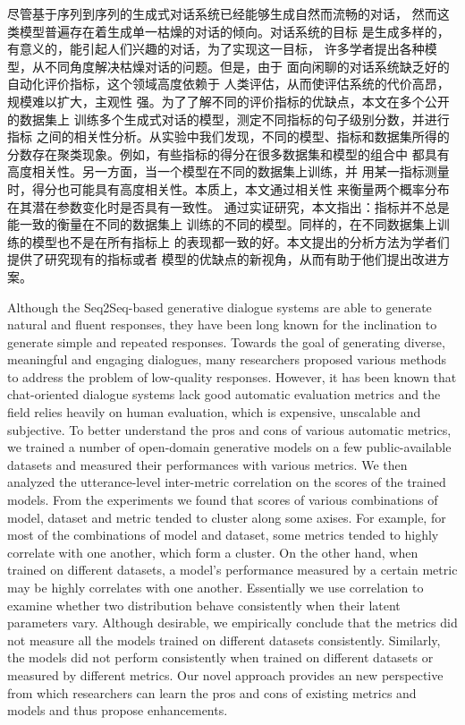 
\begin{cabstract}
    尽管基于序列到序列的生成式对话系统已经能够生成自然而流畅的对话，
    然而这类模型普遍存在着生成单一枯燥的对话的倾向。对话系统的目标
    是生成多样的，有意义的，能引起人们兴趣的对话，为了实现这一目标，
    许多学者提出各种模型，从不同角度解决枯燥对话的问题。但是，由于
    面向闲聊的对话系统缺乏好的自动化评价指标，这个领域高度依赖于
    人类评估，从而使评估系统的代价高昂，规模难以扩大，主观性
    强。为了了解不同的评价指标的优缺点，本文在多个公开的数据集上
    训练多个生成式对话的模型，测定不同指标的句子级别分数，并进行指标
    之间的相关性分析。从实验中我们发现，不同的模型、指标和数据集所得的
    分数存在聚类现象。例如，有些指标的得分在很多数据集和模型的组合中
    都具有高度相关性。另一方面，当一个模型在不同的数据集上训练，并
    用某一指标测量时，得分也可能具有高度相关性。本质上，本文通过相关性
    来衡量两个概率分布在其潜在参数变化时是否具有一致性。
    通过实证研究，本文指出：指标并不总是能一致的衡量在不同的数据集上
    训练的不同的模型。同样的，在不同数据集上训练的模型也不是在所有指标上
    的表现都一致的好。本文提出的分析方法为学者们提供了研究现有的指标或者
    模型的优缺点的新视角，从而有助于他们提出改进方案。
\end{cabstract}

\begin{eabstract}
    Although the Seq2Seq-based generative dialogue systems     are able to generate natural and fluent responses, they have been long known for the inclination to generate simple and repeated responses. Towards the goal of generating diverse, meaningful and engaging dialogues, many researchers proposed various methods to address the problem of low-quality responses. However, it has been known that chat-oriented dialogue systems lack good automatic evaluation metrics and the field relies heavily on human evaluation, which is expensive, unscalable and subjective. To better understand the pros and cons of various automatic metrics, we trained a number of open-domain generative models on
    a few public-available datasets and measured their performances with various metrics. We then analyzed the utterance-level inter-metric correlation on the scores of the trained models. From the experiments we found that scores of various combinations of model, dataset and metric tended to cluster along some axises. For example, for most of the combinations of model and dataset, some metrics tended to highly correlate with one another, which form a cluster. On the other hand, when trained on different datasets, a model's performance measured by a certain metric may be highly correlates with one another. Essentially we use correlation to examine whether two distribution behave consistently when their latent parameters vary. Although desirable, we empirically conclude that the metrics did not measure all the models trained on different datasets consistently. Similarly, the models did not perform consistently when trained on different datasets or measured by different metrics. Our novel approach provides an new perspective from which researchers can learn the pros and cons of existing metrics and models and thus propose enhancements.
\end{eabstract}
